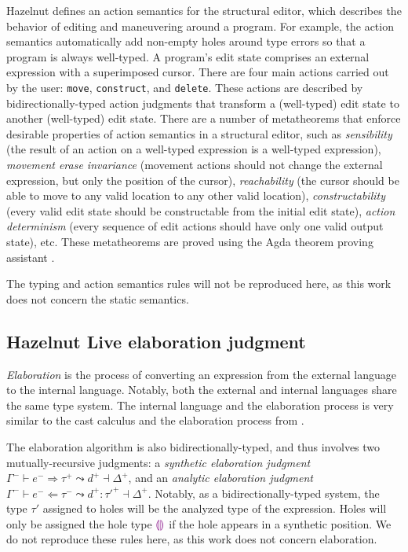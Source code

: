 Hazelnut defines an action semantics for the structural editor, which describes the behavior of editing and maneuvering around a program. For example, the action semantics automatically add non-empty holes around type errors so that a program is always well-typed. A program's edit state comprises an external expression with a superimposed cursor. There are four main actions carried out by the user: \texttt{move}, \texttt{construct}, and \texttt{delete}. These actions are described by bidirectionally-typed action judgments that transform a (well-typed) edit state to another (well-typed) edit state. There are a number of metatheorems that enforce desirable properties of action semantics in a structural editor, such as \textit{sensibility} (the result of an action on a well-typed expression is a well-typed expression), \textit{movement erase invariance} (movement actions should not change the external expression, but only the position of the cursor), \textit{reachability} (the cursor should be able to move to any valid location to any other valid location), \textit{constructability} (every valid edit state should be constructable from the initial edit state), \textit{action determinism} (every sequence of edit actions should have only one valid output state), etc. These metatheorems are proved using the Agda theorem proving assistant \cite{agda2017_git}.

The typing and action semantics rules will not be reproduced here, as this work does not concern the static semantics.

\subsection{Hazelnut Live elaboration judgment}
\label{sec:hazel-elaboration}

\textit{Elaboration} is the process of converting an expression from the external language to the internal language. Notably, both the external and internal languages share the same type system. The internal language and the elaboration process is very similar to the cast calculus \gtclc{} and the elaboration process from \gtlc{}.

The elaboration algorithm is also bidirectionally-typed, and thus involves two mutually-recursive judgments: a \textit{synthetic elaboration judgment} $\Gamma^-\vdash e^-\Rightarrow\tau^+\leadsto d^+\dashv\Delta^+$, and an \textit{analytic elaboration judgment} $\Gamma^-\vdash e^-\Leftarrow\tau^-\leadsto d^+:\tau'^+\dashv\Delta^+$. Notably, as a bidirectionally-typed system, the type $\tau'$ assigned to holes will be the analyzed type of the expression. Holes will only be assigned the hole type $\textcolor{violet}{\llparenthesis}\textcolor{violet}{\rrparenthesis}$ if the hole appears in a synthetic position. We do not reproduce these rules here, as this work does not concern elaboration.

